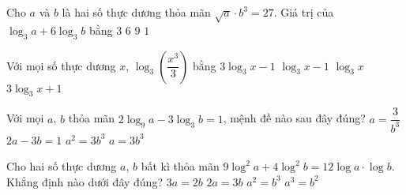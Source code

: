 \begin{ex} 
	Cho $a$ và $b$ là hai số thực dương thỏa mãn $\sqrt{a}\cdot b^3=27$. Giá trị của $\log_{3} a+6\log_{3}b$ bằng
	\choice 
	{ $3$}
	{\True $6$}
	{ $9$}
	{ $1$}
\end{ex}
\begin{ex} 
	Với mọi số thực dương $x$, $\log_3\left( \dfrac{x^3}{3}\right) $ bằng
	\choice
	{\True $3\log_3 x-1$}
	{$\log_3 x-1$}
	{$\log_3 x$}
	{$3\log_3 x+1$}
\end{ex}
\begin{ex} 
	Với mọi $a$, $b$ thỏa mãn $2\log_9a-3\log_3b=1$, mệnh đề nào sau đây đúng?
	\choice
	{$a=\dfrac{3}{b^3}$}
	{$2a-3b=1$}
	{$a^2=3b^3$}
	{\True $a=3b^3$}
\end{ex}
\begin{ex}
	Cho hai số thực dương $a$, $b$ bất kì thỏa mãn $9\log^2a+4\log^2b=12\log a\cdot \log b$. Khẳng định nào dưới đây đúng?
	\choice
	{$3a=2b$}
	{$2a=3b$}
	{$a^2=b^3$}
	{\True $a^3=b^2$}
\end{ex}
